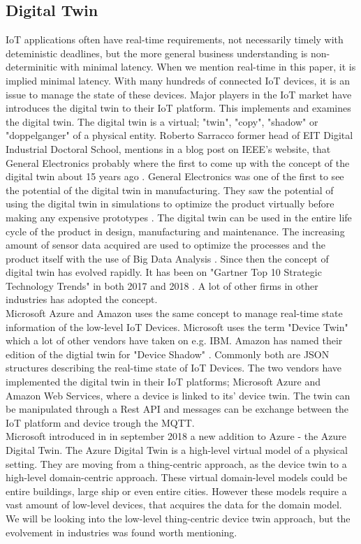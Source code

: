 \subsection{Digital Twin}
IoT applications often have real-time requirements, not necessarily timely with deteministic deadlines, but the more general business understanding is non-determinitic with minimal latency. When we mention real-time in this paper, it is implied minimal latency. With many hundreds of connected IoT devices, it is an issue to manage the state of these devices. Major players in the IoT market have introduces the digital twin to their IoT platform. This implements and examines the digital twin. The digital twin is a virtual; "twin", "copy", "shadow" or "doppelganger" of a physical entity. Roberto Sarracco former head of EIT Digital Industrial Doctoral School, mentions in a blog post on IEEE's website, that General Electronics probably where the first to come up with the concept of the digital twin about 15 years ago \cite{IEEE}.
General Electronics was one of the first to see the potential of the digital twin in manufacturing. They saw the potential of using the digital twin in simulations to optimize the product virtually before making any expensive prototypes \cite{GE}. The digital twin can be used in the entire life cycle of the product in design, manufacturing and maintenance. The increasing amount of sensor data acquired are used to optimize the processes and the product itself with the use of Big Data Analysis \cite{8477101}. Since then the concept of digital twin has evolved rapidly. It has been on "Gartner Top 10 Strategic Technology Trends" in both 2017 and 2018 \cite{Gartner}. A lot of other firms in other industries has adopted the concept. \\

Microsoft Azure and Amazon uses the same concept to manage real-time state information of the low-level IoT Devices. Microsoft uses the term "Device Twin" \cite{MS} which a lot of other vendors have taken on e.g. IBM. Amazon has named their edition of the digtial twin for "Device Shadow" \cite{Amazon}. Commonly both are JSON structures describing the real-time state of IoT Devices. The two vendors have implemented the digital twin in their IoT platforms; Microsoft Azure and Amazon Web Services, where a device is linked to its' device twin. The twin can be manipulated through a Rest API and messages can be exchange between the IoT platform and device trough the MQTT. \\

Microsoft introduced in \cite{azuredigitaltwin} in september 2018 a new addition to Azure - the Azure Digital Twin. The Azure Digital Twin is a high-level virtual model of a physical setting. They are moving from a thing-centric approach, as the device twin to a high-level domain-centric approach. These virtual domain-level models could be entire buildings, large ship or even entire cities. However these models require a vast amount of low-level devices, that acquires the data for the domain model. We will be looking into the low-level thing-centric device twin approach, but the evolvement in industries was found worth mentioning. 